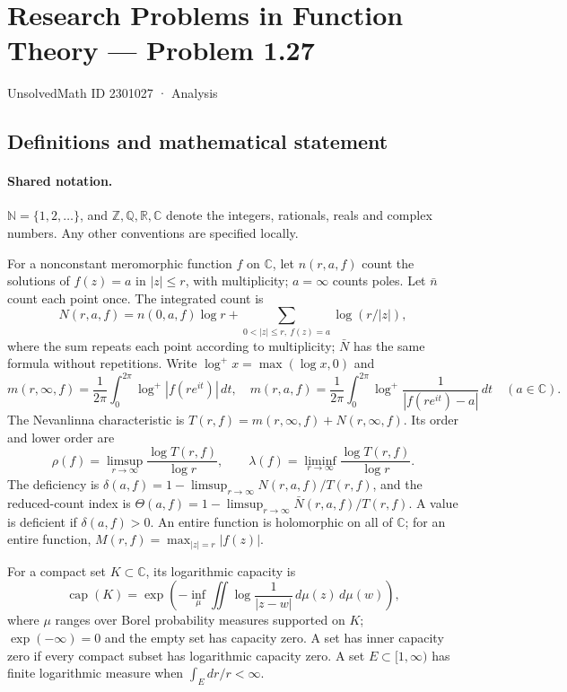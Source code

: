 \documentclass[11pt]{article}
\begin{document}
\setcounter{section}{2301026}
\section{Research Problems in Function Theory — Problem 1.27}\label{2301027}
{\small\sffamily UnsolvedMath ID 2301027 · Analysis}
\subsection{Definitions and mathematical statement}

\paragraph{Shared notation.}$\mathbb N=\{1,2,\ldots\}$, and $\mathbb Z,\mathbb Q,\mathbb R,\mathbb C$ denote the integers, rationals, reals and complex numbers. Any other conventions are specified locally.


For a nonconstant meromorphic function $f$ on $\mathbb C$, let $n(r,a,f)$ count the solutions of $f(z)=a$ in $|z|\le r$, with multiplicity; $a=\infty$ counts poles. Let $\bar n$ count each point once. The integrated count is
\[
 N(r,a,f)=n(0,a,f)\log r+\sum_{0<|z|\le r,\ f(z)=a}\log(r/|z|),
\]
where the sum repeats each point according to multiplicity; $\bar N$ has the same formula without repetitions. Write $\log^+x=\max(\log x,0)$ and
\[
 m(r,\infty,f)=\frac1{2\pi}\int_0^{2\pi}\log^+|f(re^{it})|\,dt,\quad
 m(r,a,f)=\frac1{2\pi}\int_0^{2\pi}\log^+\frac1{|f(re^{it})-a|}\,dt\quad(a\in\mathbb C).
\]
The Nevanlinna characteristic is $T(r,f)=m(r,\infty,f)+N(r,\infty,f)$. Its order and lower order are
\[
 \rho(f)=\limsup_{r\to\infty}\frac{\log T(r,f)}{\log r},\qquad
 \lambda(f)=\liminf_{r\to\infty}\frac{\log T(r,f)}{\log r}.
\]
The deficiency is $\delta(a,f)=1-\limsup_{r\to\infty}N(r,a,f)/T(r,f)$, and the reduced-count index is $\Theta(a,f)=1-\limsup_{r\to\infty}\bar N(r,a,f)/T(r,f)$. A value is deficient if $\delta(a,f)>0$. An entire function is holomorphic on all of $\mathbb C$; for an entire function, $M(r,f)=\max_{|z|=r}|f(z)|$.

For a compact set $K\subset\mathbb C$, its logarithmic capacity is
\[
 \operatorname{cap}(K)=\exp\!\left(-\inf_\mu\iint\log\frac1{|z-w|}\,d\mu(z)\,d\mu(w)\right),
\]
where $\mu$ ranges over Borel probability measures supported on $K$; $\exp(-\infty)=0$ and the empty set has capacity zero. A set has inner capacity zero if every compact subset has logarithmic capacity zero. A set $E\subset[1,\infty)$ has finite logarithmic measure when $\int_E dr/r<\infty$.
\end{document}
